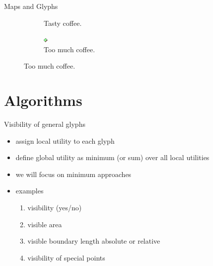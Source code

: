 \documentclass{beamer}
\begin{document}
\begin{frame}{Maps and Glyphs}
\begin{figure}[!b]
\begin{subfigure}[b]{0.45\linewidth}
      \caption{Tasty coffee.}
    \end{subfigure}
    \begin{subfigure}[b]{0.45\linewidth}
      \centering
      \includegraphics[width=0.5\linewidth]{assets/symbol_square}
      \caption{Too much coffee.}
    \end{subfigure}
  \end{figure}

\end{frame}

\section{Algorithms}

\begin{frame}{Visibility of general glyphs}
    \begin{itemize}
        \item assign local utility to each glyph
        \item define global utility as minimum (or sum) over all local utilities
        \item we will focus on minimum approaches
        \item examples
        \begin{enumerate}
            \item visibility (yes/no)
            \item visible area
            \item visible boundary length absolute or relative
            \item visibility of special points
        \end{enumerate}
    \end{itemize}
\end{frame}
\end{document}
